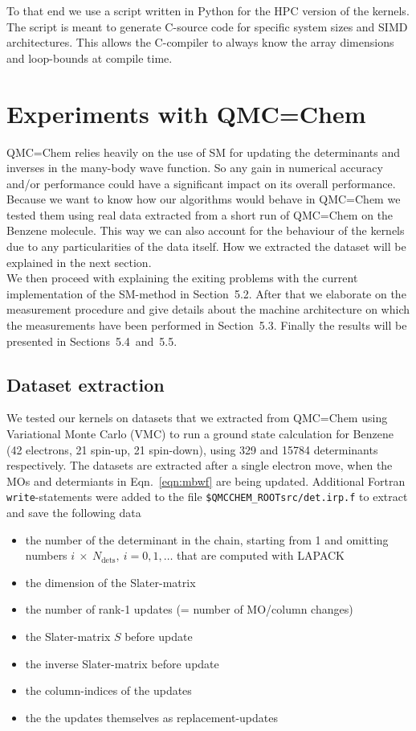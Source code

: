 \documentclass[11pt]{article}
\numberwithin{figure}{section}
\numberwithin{table}{section}
\begin{document}
      To that end we use a script written in Python for the HPC version of the kernels. The script is meant to generate C-source code for specific system sizes and SIMD architectures. This allows the C-compiler to always know the array dimensions and loop-bounds at compile time.
            			
  \section{Experiments with QMC=Chem}
    QMC=Chem relies heavily on the use of SM for updating the determinants and inverses in the many-body wave function. So any gain in numerical accuracy and/or performance could have a significant impact on its overall performance.\\
    
    Because we want to know how our algorithms would behave in QMC=Chem we tested them using real data extracted from a short run of QMC=Chem on the Benzene molecule. This way we can also account for the behaviour of the kernels due to any particularities of the data itself. How we extracted the dataset will be explained in the next section.\\
    
    We then proceed with explaining the exiting problems with the current implementation of the SM-method in Section~5.2. After that we elaborate on the measurement procedure and give details about the machine architecture on which the measurements have been performed in Section~5.3. Finally the results will be presented in Sections~5.4~and~5.5.
    
    \subsection{Dataset extraction}
    	We tested our kernels on datasets that we extracted from QMC=Chem using Variational Monte Carlo (VMC) to run a ground state calculation for Benzene (42 electrons, 21 spin-up, 21 spin-down), using 329 and 15784 determinants respectively. The datasets are extracted after a single electron move, when the MOs and determiants in Eqn.~\ref{eqn:mbwf} are being updated. Additional Fortran \texttt{write}-statements were added to the file \texttt{\$QMCCHEM\_ROOTsrc/det.irp.f} to extract and save the following data
    	\begin{itemize}
    		\item the number of the determinant in the chain, starting from 1 and omitting numbers $i~\times~N_\mathrm{dets},~i=0,1,\ldots$ that are computed with LAPACK
    		\item the dimension of the Slater-matrix
    		\item the number of rank-1 updates (= number of MO/column changes)
    		\item the Slater-matrix $S$ before update
    		\item the inverse Slater-matrix before update
    		\item the column-indices of the updates
    		\item the the updates themselves as replacement-updates
    \end{itemize}
    
\end{document}
